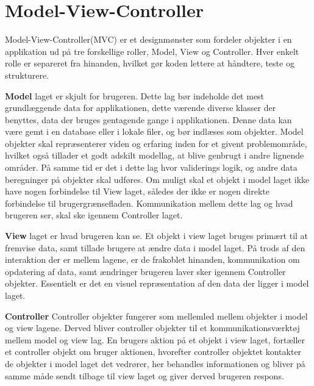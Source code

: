 \chapter{Model-View-Controller}
Model-View-Controller(MVC) er et designmønster som fordeler 
objekter i en applikation ud på tre forskellige roller, 
Model, View og Controller. Hver enkelt rolle er separeret fra 
hinanden, hvilket gør koden lettere at håndtere, teste og strukturere.

\textbf{Model} laget er skjult for brugeren. Dette lag bør 
indeholde det mest grundlæggende data for applikationen, 
dette værende diverse klasser der benyttes, data der bruges 
gentagende gange i applikationen. Denne data kan være gemt i en database eller i lokale filer, og bør indlæses som objekter. Model 
objekter skal repræsenterer viden og erfaring inden for et 
givent problemområde, hvilket også tillader et godt adskilt 
modellag, at blive genbrugt i andre lignende områder. På 
samme tid er det i dette lag hvor validerings logik, og andre 
data beregninger på objekter skal udføres. Om muligt skal 
et objekt i model laget ikke have nogen forbindelse til 
View laget, således der ikke er nogen direkte forbindelse til 
brugergrænsefladen. Kommunikation mellem dette lag og hvad 
brugeren ser, skal ske igennem Controller laget.

\textbf{View} laget er hvad brugeren kan se. Et objekt i view 
laget bruges primært til at fremvise data, samt tillade 
brugere at ændre data i model laget. På trods af den 
interaktion der er mellem lagene, er de frakoblet hinanden, 
kommunikation om opdatering af data, samt ændringer brugeren 
laver sker igennem Controller objekter. Essentielt er det en 
visuel repræsentation af den data der ligger i model laget.

\textbf{Controller}
Controller objekter fungerer som mellemled mellem objekter i 
model og view lagene. Derved bliver controller objekter til 
et kommunikationsværktøj mellem model og view lag. En brugers 
aktion på et objekt i view laget, fortæller et controller 
objekt om bruger aktionen, hvorefter controller objektet 
kontakter de objekter i model laget det vedrører, her 
behandles informationen og bliver på samme måde sendt tilbage 
til view laget og giver derved brugeren respons.